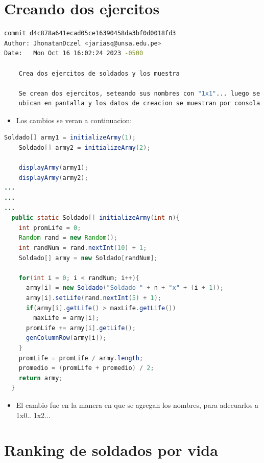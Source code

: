 \section{Creando dos ejercitos}
\begin{lstlisting}[language=bash, caption={Commit principal}]
commit d4c878a641ecad05ce16390458da3bf0d0018fd3
Author: JhonatanDczel <jariasq@unsa.edu.pe>
Date:   Mon Oct 16 16:02:24 2023 -0500

    Crea dos ejercitos de soldados y los muestra

    Se crean dos ejercitos, seteando sus nombres con "1x1"... luego se
    ubican en pantalla y los datos de creacion se muestran por consola
\end{lstlisting}
\begin{itemize}
    \item Los cambios se veran a continuacion:
\end{itemize}
\begin{lstlisting}[language=java, caption={VideoJuego.java}]
    Soldado[] army1 = initializeArmy(1); 
    Soldado[] army2 = initializeArmy(2); 

    displayArmy(army1);
    displayArmy(army2);
...
...
...
  public static Soldado[] initializeArmy(int n){
    int promLife = 0;
    Random rand = new Random();
    int randNum = rand.nextInt(10) + 1;
    Soldado[] army = new Soldado[randNum];

    for(int i = 0; i < randNum; i++){
      army[i] = new Soldado("Soldado " + n + "x" + (i + 1));
      army[i].setLife(rand.nextInt(5) + 1);
      if(army[i].getLife() > maxLife.getLife())
        maxLife = army[i];
      promLife += army[i].getLife();
      genColumnRow(army[i]);
    }
    promLife = promLife / army.length;
    promedio = (promLife + promedio) / 2;
    return army;
  }

\end{lstlisting}
\begin{itemize}
    \item El cambio fue en la manera en que se agregan los nombres, para adecuarlos a 1x0.. 1x2...
\end{itemize}
\section{Ranking de soldados por vida}

